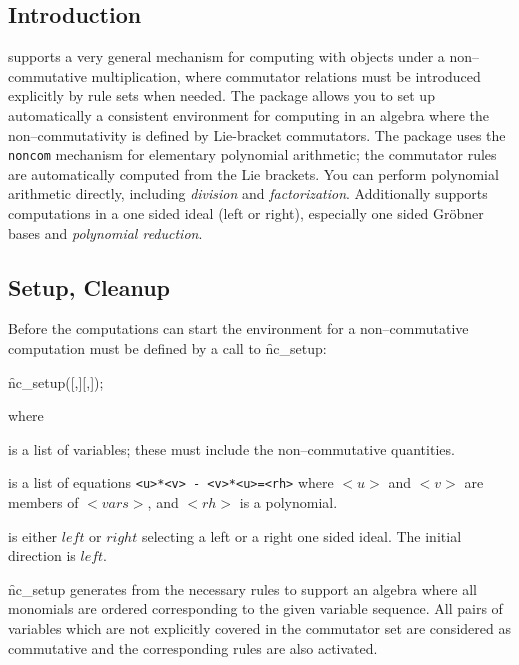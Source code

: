 
\subsection{Introduction}

{\REDUCE} supports a very general mechanism for computing
with objects under a non--commutative multiplication, where
commutator relations must be introduced explicitly by rule
sets when needed. The package  allows you to
set up automatically a consistent environment for computing in an algebra
where the non--commutativity is defined by Lie-bracket commutators.
The package uses the {\REDUCE} \texttt{noncom}
mechanism for elementary polynomial arithmetic; the commutator
rules are automatically computed from the Lie brackets.
You can perform polynomial arithmetic directly, including
\emph{division} and \emph{factorization}.
Additionally  supports computations in a one sided ideal (left or right),
especially one sided Gr\"obner bases and  \emph{polynomial reduction}.

\subsection{Setup, Cleanup}

\hypertarget{operator:NC_SETUP}{}
Before the computations can start the environment for a
non--commutative computation must be defined by a
call to \f{nc\_setup}:
\begin{syntax}
    \f{nc\_setup}([,][,]);
\end{syntax}
where

 is a list of variables; these must include the
non--commutative quantities.

 is a list of equations \texttt{<u>*<v> - <v>*<u>=<rh>}
where $<u>$ and $<v>$ are members of $<vars>$, and $<rh>$ is
a polynomial.

 is either $left$ or $right$ selecting a left or a
right one sided ideal. The initial direction is $left$.

\f{nc\_setup} generates from  the necessary
rules to support an algebra where all monomials are
ordered corresponding to the given variable sequence.
All pairs of variables which are not explicitly covered in
the commutator set are considered as commutative and the
corresponding rules are also activated.

